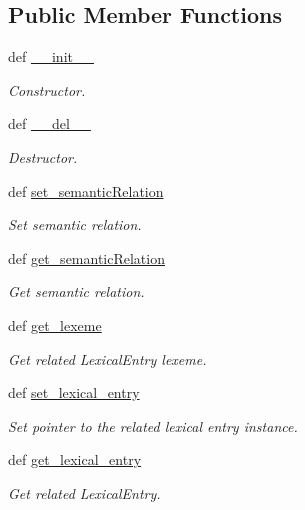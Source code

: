 \subsection*{Public Member Functions}
\begin{DoxyCompactItemize}
\item 
def \hyperlink{classlmf_1_1src_1_1morphology_1_1related__form_1_1_related_form_a241b3ec09b1802d10729f8fb4339300f}{\+\_\+\+\_\+init\+\_\+\+\_\+}
\begin{DoxyCompactList}\small\item\em Constructor. \end{DoxyCompactList}\item 
def \hyperlink{classlmf_1_1src_1_1morphology_1_1related__form_1_1_related_form_ae818d13f0783dafff76a95b4c1067e73}{\+\_\+\+\_\+del\+\_\+\+\_\+}
\begin{DoxyCompactList}\small\item\em Destructor. \end{DoxyCompactList}\item 
def \hyperlink{classlmf_1_1src_1_1morphology_1_1related__form_1_1_related_form_aeed3632165ec647be92c3804b32d2086}{set\+\_\+semantic\+Relation}
\begin{DoxyCompactList}\small\item\em Set semantic relation. \end{DoxyCompactList}\item 
def \hyperlink{classlmf_1_1src_1_1morphology_1_1related__form_1_1_related_form_a6c3cee5a3774ff44e1655671c75fa416}{get\+\_\+semantic\+Relation}
\begin{DoxyCompactList}\small\item\em Get semantic relation. \end{DoxyCompactList}\item 
def \hyperlink{classlmf_1_1src_1_1morphology_1_1related__form_1_1_related_form_a59ce1027881334fbf401bb9ffdd038e2}{get\+\_\+lexeme}
\begin{DoxyCompactList}\small\item\em Get related Lexical\+Entry lexeme. \end{DoxyCompactList}\item 
def \hyperlink{classlmf_1_1src_1_1morphology_1_1related__form_1_1_related_form_a84a43a4e867995031989488d1b5e397b}{set\+\_\+lexical\+\_\+entry}
\begin{DoxyCompactList}\small\item\em Set pointer to the related lexical entry instance. \end{DoxyCompactList}\item 
def \hyperlink{classlmf_1_1src_1_1morphology_1_1related__form_1_1_related_form_a851db32ef1f30794cdb921778058bc38}{get\+\_\+lexical\+\_\+entry}
\begin{DoxyCompactList}\small\item\em Get related Lexical\+Entry. \end{DoxyCompactList}\end{DoxyCompactItemize}
